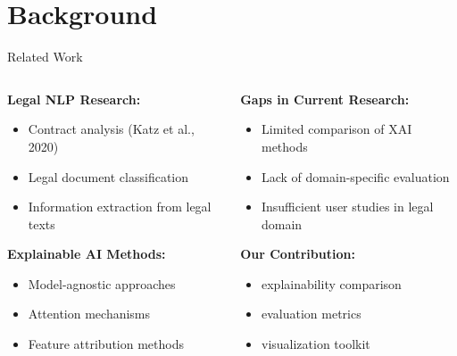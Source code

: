 
\section{Background}

\begin{frame}{Related Work}
\begin{columns}
\begin{column}{0.5\textwidth}
\textbf{Legal NLP Research:}
\begin{itemize}
    \item Contract analysis (Katz et al., 2020)
    \item Legal document classification
    \item Information extraction from legal texts
\end{itemize}

\vspace{0.5cm}
\textbf{Explainable AI Methods:}
\begin{itemize}
    \item Model-agnostic approaches
    \item Attention mechanisms
    \item Feature attribution methods
\end{itemize}
\end{column}
\begin{column}{0.5\textwidth}
\textbf{Gaps in Current Research:}
\begin{itemize}
    \item Limited comparison of XAI methods
    \item Lack of domain-specific evaluation
    \item Insufficient user studies in legal domain
\end{itemize}

\vspace{0.5cm}
\textbf{Our Contribution:}
\begin{itemize}
    \item {} explainability comparison
    \item {} evaluation metrics
    \item {} visualization toolkit
\end{itemize}
\end{column}
\end{columns}
\end{frame}

